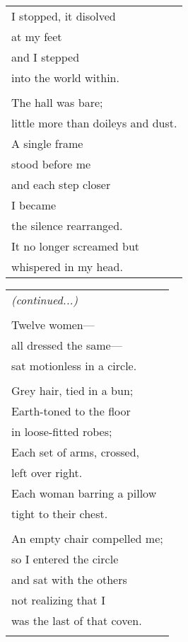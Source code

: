 \documentclass{article}
\begin{document}
\begin{center}
\begin{tabular}{l}
I stopped, it disolved \\
at my feet \\
and I stepped \\
into the world within. \\
\\
The hall was bare; \\
little more than doileys and dust. \\
A single frame \\
stood before me \\
and each step closer \\
I became \\
the silence rearranged. \\
It no longer screamed but \\
whispered in my head. \\
\end{tabular}
\begin{tabular}{l}
{\footnotesize \textit{(continued...)}} \\
\\
Twelve women--- \\
all dressed the same--- \\
sat motionless in a circle. \\
\\
\hspace*{4ex}Grey hair, tied in a bun; \\
\hspace*{4ex}Earth-toned to the floor \\
\hspace*{6ex}in loose-fitted robes; \\
\hspace*{4ex}Each set of arms, crossed, \\
\hspace*{6ex}left over right. \\
\hspace*{4ex}Each woman barring a pillow \\
\hspace*{6ex}tight to their chest. \\
\\
An empty chair compelled me; \\
so I entered the circle \\
and sat with the others \\
not realizing that I \\
was the last of that coven. \\
\\

\end{tabular}
\end{center}
\end{document}
